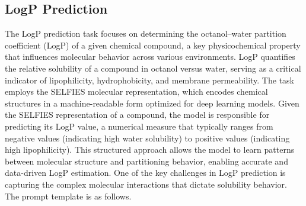 \subsection{LogP Prediction}
The LogP prediction task focuses on determining the octanol–water partition coefficient (LogP) of a given chemical compound, a key physicochemical property that influences molecular behavior across various environments. LogP quantifies the relative solubility of a compound in octanol versus water, serving as a critical indicator of lipophilicity, hydrophobicity, and membrane permeability.
The task employs the SELFIES molecular representation, which encodes chemical structures in a machine-readable form optimized for deep learning models. Given the SELFIES representation of a compound, the model is responsible for predicting its LogP value, a numerical measure that typically ranges from negative values (indicating high water solubility) to positive values (indicating high lipophilicity). This structured approach allows the model to learn patterns between molecular structure and partitioning behavior, enabling accurate and data-driven LogP estimation. One of the key challenges in LogP prediction is capturing the complex molecular interactions that dictate solubility behavior. The prompt template is as follows.

